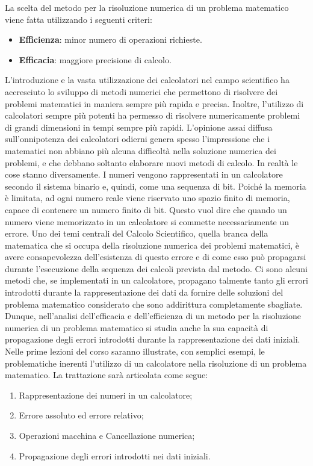 \documentclass{article}
\theoremstyle{plain}
\theoremstyle{definition}
\theoremstyle{remark}
\begin{document}
La scelta del metodo per la risoluzione numerica di un problema matematico viene fatta utilizzando i seguenti criteri:
\begin{itemize}
    \item \textbf{Efficienza}: minor numero di operazioni richieste.
    \item \textbf{Efficacia}: maggiore precisione di calcolo.
\end{itemize}
L'introduzione e la vasta utilizzazione dei calcolatori nel campo scientifico ha accresciuto lo sviluppo di metodi numerici che permettono di risolvere dei problemi matematici in maniera sempre più rapida e precisa.
Inoltre, l'utilizzo di calcolatori sempre più potenti ha permesso di risolvere numericamente problemi di grandi dimensioni in tempi sempre più rapidi.
L'opinione assai diffusa sull'onnipotenza dei calcolatori odierni genera spesso l'impressione che i matematici non abbiano più alcuna difficoltà nella soluzione numerica dei problemi, e che debbano soltanto elaborare nuovi metodi di calcolo.
In realtà le cose stanno diversamente.
I numeri vengono rappresentati in un calcolatore secondo il sistema binario e, quindi, come una sequenza di bit.
Poiché la memoria è limitata, ad ogni numero reale viene riservato uno spazio finito di memoria, capace di contenere un numero finito di bit.
Questo vuol dire che quando un numero viene memorizzato in un calcolatore si commette necessariamente un errore.
Uno dei temi centrali del Calcolo Scientifico, quella branca della matematica che si occupa della risoluzione numerica dei problemi matematici, è avere consapevolezza dell'esistenza di questo errore e di come esso può propagarsi durante l'esecuzione della sequenza dei calcoli prevista dal metodo.
Ci sono alcuni metodi che, se implementati in un calcolatore, propagano talmente tanto gli errori introdotti durante la rappresentazione dei dati da fornire delle soluzioni del problema matematico considerato che sono addirittura completamente sbagliate.
Dunque, nell'analisi dell'efficacia e dell'efficienza di un metodo per la risoluzione numerica di un problema matematico si studia anche la sua capacità di propagazione degli errori introdotti durante la rappresentazione dei dati iniziali.
Nelle prime lezioni del corso saranno illustrate, con semplici esempi, le problematiche inerenti l'utilizzo di un calcolatore nella risoluzione di un problema matematico.
La trattazione sarà articolata come segue:
\begin{enumerate}
    \item Rappresentazione dei numeri in un calcolatore;
    \item Errore assoluto ed errore relativo;
    \item Operazioni macchina e Cancellazione numerica;
    \item Propagazione degli errori introdotti nei dati iniziali.
\end{enumerate}
\end{document}
